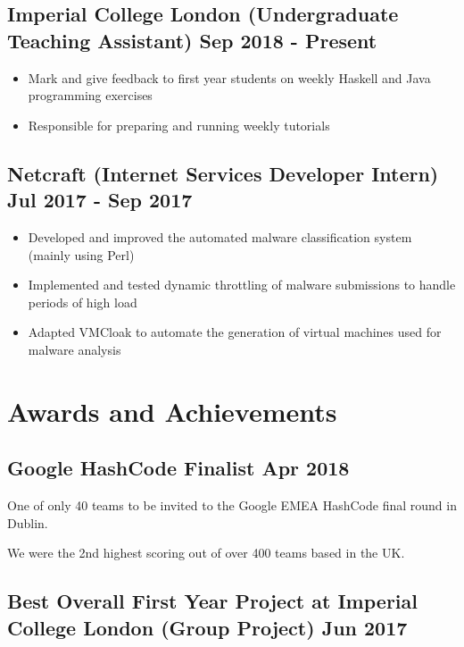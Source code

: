 \documentclass[a4paper]{article}
\begin{document}
\subsection*{Imperial College London \textnormal{(Undergraduate Teaching Assistant)} \hfill Sep 2018 - Present}

\begin{itemize}
    \item Mark and give feedback to first year students on weekly Haskell and Java programming exercises
    \item Responsible for preparing and running weekly tutorials
\end{itemize}

\subsection*{Netcraft \textnormal{(Internet Services Developer Intern)} \hfill Jul 2017 - Sep 2017}

\begin{itemize}
    \item Developed and improved the automated malware classification system (mainly using Perl)
    \item Implemented and tested dynamic throttling of malware submissions to handle periods of high load
    \item Adapted VMCloak to automate the generation of virtual machines used for malware analysis
\end{itemize}

\section*{Awards and Achievements}

\subsection*{Google HashCode Finalist \hfill Apr 2018}

One of only 40 teams to be invited to the Google EMEA HashCode final round in Dublin.

We were the 2nd highest scoring out of over 400 teams based in the UK.

\subsection*{Best Overall First Year Project at Imperial College London \textnormal{(Group Project)} \hfill Jun 2017}
\end{document}
